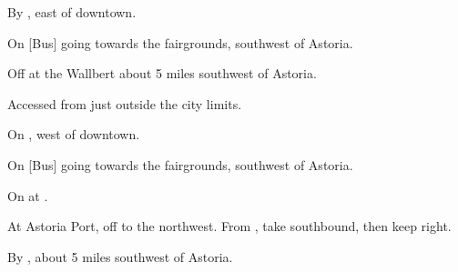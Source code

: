 

\begin{LocationList}

By , east of downtown.

On [Bus] going towards the fairgrounds, southwest of Astoria.

Off  at the Wallbert about 5 miles southwest of Astoria.

Accessed from  just outside the city limits.

\Location{\GasStation \Gas}
On , west of downtown.

On [Bus] going towards the fairgrounds, southwest of Astoria.

\Location{\RestArea \Rest}
On  at .

At Astoria Port, off  to the northwest. From , take  southbound, then keep right.

By , about 5 miles southwest of Astoria.

\end{LocationList}
